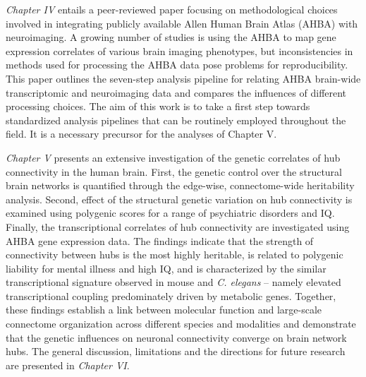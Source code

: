 \textit{Chapter IV} entails a peer-reviewed paper focusing on methodological choices involved in integrating publicly available Allen Human Brain Atlas (AHBA) with neuroimaging. A growing number of studies is using the AHBA to map gene expression correlates of various brain imaging phenotypes, but inconsistencies in methods used for processing the AHBA data pose problems for reproducibility. This paper outlines the seven-step analysis pipeline for relating AHBA brain-wide transcriptomic and neuroimaging data and compares the influences of different processing choices. The aim of this work is to take a first step towards standardized analysis pipelines that can be routinely employed throughout the field. It is a necessary precursor for the analyses of Chapter V.

\textit{Chapter V} presents an extensive investigation of the genetic correlates of hub connectivity in the human brain. First, the genetic control over the structural brain networks is quantified through the edge-wise, connectome-wide heritability analysis. Second, effect of the structural genetic variation on hub connectivity is examined using polygenic scores for a range of psychiatric disorders and IQ. Finally, the transcriptional correlates of hub connectivity are investigated using AHBA gene expression data. The findings indicate that the strength of connectivity between hubs is the most highly heritable, is related to polygenic liability for mental illness and high IQ, and is characterized by the similar transcriptional signature observed in mouse and \textit{C. elegans} -- namely elevated transcriptional coupling predominately driven by metabolic genes. Together, these findings establish a link between molecular function and large-scale connectome organization across different species and modalities and demonstrate that the genetic influences on neuronal connectivity converge on brain network hubs. The general discussion, limitations and the directions for future research are presented in \textit{Chapter VI}.
